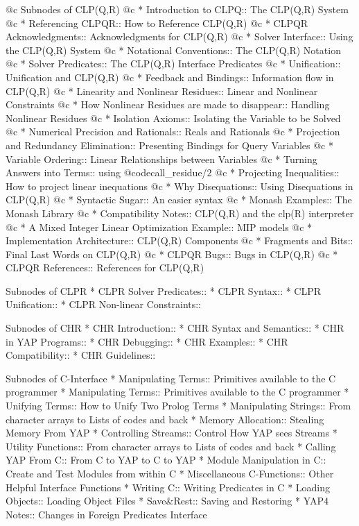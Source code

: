 @c Subnodes of CLP(Q,R)
@c * Introduction to CLPQ:: The CLP(Q,R) System
@c * Referencing CLPQR:: How to Reference CLP(Q,R)
@c * CLPQR Acknowledgments:: Acknowledgments for CLP(Q,R)
@c * Solver Interface:: Using the CLP(Q,R) System
@c * Notational Conventions:: The CLP(Q,R) Notation
@c * Solver Predicates:: The CLP(Q,R) Interface Predicates
@c * Unification:: Unification and CLP(Q,R)
@c * Feedback and Bindings:: Information flow in CLP(Q,R)
@c * Linearity and Nonlinear Residues:: Linear and Nonlinear Constraints
@c * How Nonlinear Residues are made to disappear:: Handling Nonlinear Residues
@c * Isolation Axioms:: Isolating the Variable to be Solved
@c * Numerical Precision and Rationals:: Reals and Rationals
@c * Projection and Redundancy Elimination:: Presenting Bindings for Query Variables
@c * Variable Ordering:: Linear Relationships between Variables
@c * Turning Answers into Terms:: using @code{call_residue/2}
@c * Projecting Inequalities:: How to project linear inequations
@c * Why Disequations:: Using Disequations in CLP(Q,R)
@c * Syntactic Sugar:: An easier syntax
@c * Monash Examples:: The Monash Library
@c * Compatibility Notes:: CLP(Q,R) and the clp(R) interpreter
@c * A Mixed Integer Linear Optimization Example:: MIP models
@c * Implementation Architecture:: CLP(Q,R) Components
@c * Fragments and Bits:: Final Last Words on CLP(Q,R)
@c * CLPQR Bugs:: Bugs in CLP(Q,R)
@c * CLPQR References:: References for CLP(Q,R)

Subnodes of CLPR
* CLPR Solver Predicates::
* CLPR Syntax::
* CLPR Unification::
* CLPR Non-linear Constraints::               

Subnodes of CHR
* CHR Introduction::            
* CHR Syntax and Semantics::
* CHR in YAP Programs::
* CHR Debugging::               
* CHR Examples::       
* CHR Compatibility::     
* CHR Guidelines::  

Subnodes of C-Interface
* Manipulating Terms:: Primitives available to the C programmer
* Manipulating Terms:: Primitives available to the C programmer
* Unifying Terms:: How to Unify Two Prolog Terms
* Manipulating Strings:: From character arrays to Lists of codes and back
* Memory Allocation:: Stealing Memory From YAP
* Controlling Streams:: Control How YAP sees Streams
* Utility Functions:: From character arrays to Lists of codes and back
* Calling YAP From C:: From C to YAP to C to YAP 
* Module Manipulation in C:: Create and Test Modules from within C
* Miscellaneous C-Functions:: Other Helpful Interface Functions
* Writing C:: Writing Predicates in C
* Loading Objects:: Loading Object Files
* Save&Rest:: Saving and Restoring
* YAP4 Notes:: Changes in Foreign Predicates Interface

